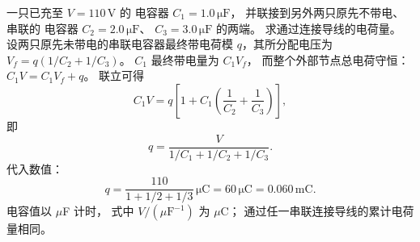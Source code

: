 一只已充至 $V=110\,\mathrm V$ 的
电容器 $C_1=1.0\,\mathrm{\mu F}$，
并联接到另外两只原先不带电、串联的
电容器 $C_2=2.0\,\mathrm{\mu F}$、
$C_3=3.0\,\mathrm{\mu F}$ 的两端。
求通过连接导线的电荷量。
\exsolution
设两只原先未带电的串联电容器最终带电荷模
$q$，其所分配电压为
$V_f=q(1/C_2+1/C_3)$。
$C_1$ 最终带电量为 $C_1V_f$，
而整个外部节点总电荷守恒：
$C_1V=C_1V_f+q$。
联立可得
\[
C_1V=q\left[1+C_1
\left(\frac1{C_2}+\frac1{C_3}\right)\right],
\]
即
\[
\boxed{q=\frac{V}
{1/C_1+1/C_2+1/C_3}}.
\]
代入数值：
\[
\boxed{q=\frac{110}{1+1/2+1/3}\,\mathrm{\mu C}
=60\,\mathrm{\mu C}=0.060\,\mathrm{mC}}.
\]
\excheck 电容值以 $\mu$F 计时，
式中 $V/(\mu\mathrm F^{-1})$ 为 $\mu$C；
通过任一串联连接导线的累计电荷量相同。

